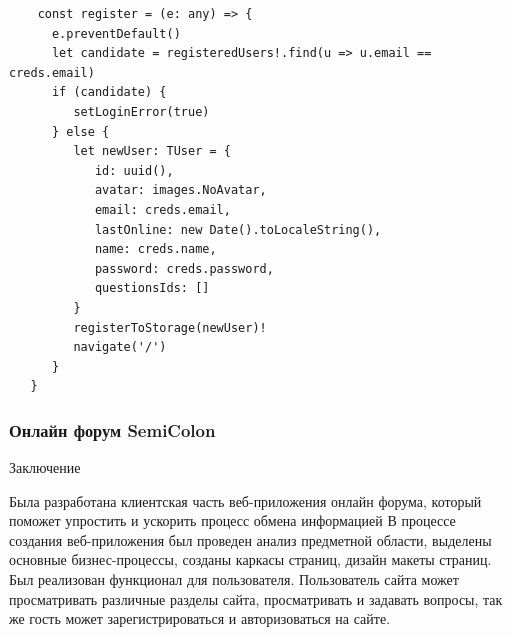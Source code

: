 \documentclass[aspectratio=169]{beamer}
\begin{document}
\begin{frame}[fragile]
  \begin{verbatim}
    const register = (e: any) => {
      e.preventDefault()
      let candidate = registeredUsers!.find(u => u.email == creds.email)
      if (candidate) {
         setLoginError(true)
      } else {
         let newUser: TUser = {
            id: uuid(),
            avatar: images.NoAvatar,
            email: creds.email,
            lastOnline: new Date().toLocaleString(),
            name: creds.name,
            password: creds.password,
            questionsIds: []
         }
         registerToStorage(newUser)!
         navigate('/')
      }
   }
  \end{verbatim}
\end{frame}

\begin{frame}
  \frametitle{Онлайн форум SemiColon}
    \begin{center}
    \huge{Заключение}
  \end{center}
  
  Была разработана клиентская часть веб-приложения онлайн форума, который поможет упростить и ускорить процесс обмена информацией
  В процессе создания веб-приложения был проведен анализ предметной области, выделены основные бизнес-процессы, созданы каркасы страниц, дизайн макеты страниц. Был реализован функционал для пользователя. Пользователь сайта может просматривать различные разделы сайта, просматривать и задавать вопросы, так же гость может зарегистрироваться и авторизоваться на сайте.

  \begin{center}
  \href{https://year3half2.vercel.app/}{}  
  \end{center}
\end{frame}
\end{document}

